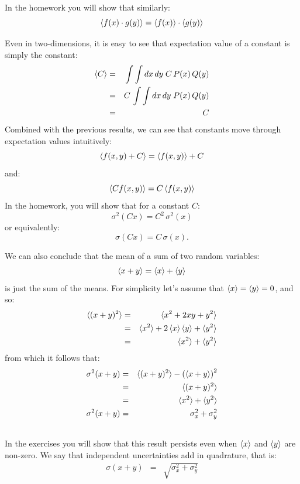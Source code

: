 \documentclass[12pt,oneside]{book}
\begin{document}
In the homework you will show that similarly:
\begin{equation}
\braket{f(x) \cdot g(y)} = \braket{f(x)} \cdot \braket{g(y)} \label{eqn:expprod}
\end{equation}

Even in two-dimensions, it is easy to see that expectation value of a
constant is simply the constant:
\begin{eqnarray*}
\braket{C} &=& \int \int dx \, dy \; C \, P(x) \, Q(y) \\
&=& C \, \int \int dx \, dy \; P(x) \, Q(y) \\
&=& C \\
\end{eqnarray*}
Combined with the previous results, we can see that constants move through expectation values intuitively:
\begin{equation}
  \braket{f(x,y) + C } = \braket{f(x,y)} + C  
\end{equation}
and:
\begin{equation}
  \braket{C f(x,y) } = C \braket{f(x,y)}  
\end{equation}
In the homework, you will show that for a constant $C$:
\begin{equation}
 \sigma^2(Cx) = C^2 \, \sigma^2(x)  \label{eqn:scalevar}
\end{equation}
or equivalently:
\begin{equation*}
 \sigma(Cx) = C\, \sigma(x).
\end{equation*}

We can also conclude that the mean of a sum of two random variables:
\begin{displaymath}
\braket{x + y} = \braket{x} + \braket{y} 
\end{displaymath}
is just the sum of the means.  For simplicity let's assume that
$\braket{x} = \braket{y} = 0$, and so:
\begin{eqnarray*}
\braket{(x + y)^2} &=& \braket{x^2 + 2xy + y^2} \\
&=& \braket{x^2} + 2\braket{x}\braket{y} + \braket{y^2} \\
&=& \braket{x^2} + \braket{y^2} \\
\end{eqnarray*}
from which it follows that:
\begin{eqnarray}
\sigma^2(x+y) &=& \braket{(x+y)^2} - \left( \braket{x+y} \right) ^2 \nonumber \\
&=& \braket{(x+y)^2} \nonumber \\
&=& \braket{x^2} + \braket{y^2 } \nonumber \\
\sigma^2(x+y) &=& \sigma^2_x + \sigma^2_y \label{eqn:varsum} \\
\nonumber
\end{eqnarray}
In the exercises you will show that this result persists even when $\braket{x}$ and
$\braket{y}$ are non-zero.  We say that independent uncertainties add in quadrature, that is:
\begin{eqnarray*}
\sigma(x+y) &=& \sqrt{\sigma^2_x + \sigma^2_y} \\
\end{eqnarray*}
\end{document}
